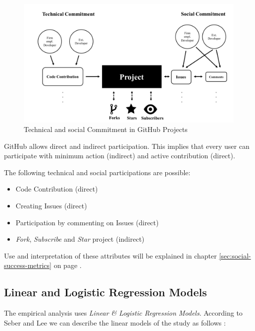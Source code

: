 \begin{figure}[!h]
	\centering
	\includegraphics[page=1,scale=0.45]{../graphics/figure_contribution.pdf}
	\caption{Technical and social Commitment in GitHub Projects}
	\label{fig:forms_of_commitment}
\end{figure}

GitHub allows direct and indirect participation. This implies that every user can participate with minimum action (indirect) and active contribution (direct).

The following technical and social participations are possible:

\begin{itemize}
	\item Code Contribution (direct)
	\item Creating Issues (direct)
	\item Participation by commenting on Issues (direct)
	\item \textit{Fork}, \textit{Subscribe} and \textit{Star} project (indirect)
\end{itemize}

Use and interpretation of these attributes will be explained in chapter \ref{sec:social-success-metrics} on page \pageref{sec:social-success-metrics}.

\clearpage
\subsection{Linear and Logistic Regression Models}

The empirical analysis uses \textit{Linear \& Logistic Regression Models}. According to Seber and Lee we can describe the linear models of the study as follows \cite[p.35]{seber2012linear}:

